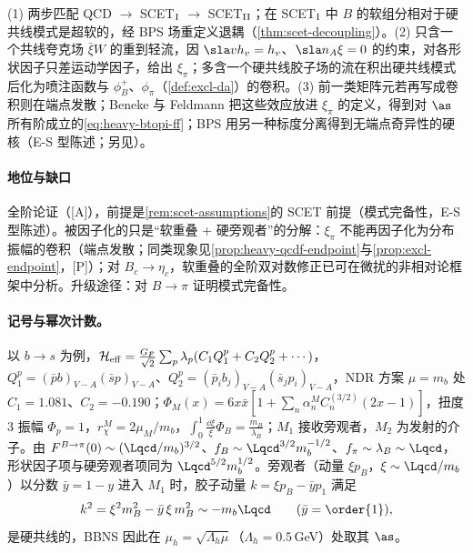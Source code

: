 \begin{proofsketch}
(1) 两步匹配 QCD $\to$ SCET$_{\rm I}$ $\to$ SCET$_{\rm II}$；在 SCET$_{\rm I}$ 中 $B$ 的软组分相对于硬共线模式是超软的，经 BPS 场重定义退耦（\cref{thm:scet-decoupling}）。(2) 只含一个共线夸克场 $\bar\xi W$ 的重到轻流，因 $\sla vh_v=h_v$、$\sla n_A\xi=0$ 的约束，对各形状因子只差运动学因子，给出 $\xi_\pi$；多含一个硬共线胶子场的流在积出硬共线模式后化为喷注函数与 $\phi_B^+$、$\phi_\pi$（\cref{def:excl-da}）的卷积。(3) 前一类矩阵元若再写成卷积则在端点发散；Beneke 与 Feldmann 把这些效应放进 $\xi_\pi$ 的定义，得到对 $\as$ 所有阶成立的\cref{eq:heavy-btopi-ff}\cite{Beneke:2003pa}；BPS 用另一种标度分离得到无端点奇异性的硬核\cite{Bauer:2002aj}（E-S 型陈述；另见\cite{Hill:2002vw,Beneke:2005gs}）。
\end{proofsketch}

\paragraph{地位与缺口}
全阶论证（[A]），前提是\cref{rem:scet-assumptions}的 SCET 前提（模式完备性，E-S 型陈述）。被因子化的只是“软重叠 + 硬旁观者”的分解：$\xi_\pi$ 不能再因子化为分布振幅的卷积（端点发散；同类现象见\cref{prop:heavy-qcdf-endpoint}与\cref{prop:excl-endpoint}，[P]）；对 $B_c\to\eta_c$，软重叠的全阶双对数修正已可在微扰的非相对论框架中分析\cite{Bell:2024bxg}。升级途径：对 $B\to\pi$ 证明模式完备性。

\paragraph{记号与幂次计数。}
以 $b\to s$ 为例，$\mathcal H_{\rm eff}=\frac{G_F}{\sqrt2}\sum_{p}\lambda_p(C_1Q_1^p+C_2Q_2^p+\cdots)$，$Q_1^p=(\bar pb)_{V-A}(\bar sp)_{V-A}$、$Q_2^p=(\bar p_ib_j)_{V-A}(\bar s_jp_i)_{V-A}$，NDR 方案 $\mu=m_b$ 处 $C_1=1.081$、$C_2=-0.190$\cite[表~1]{BenekeEtAl2001}；$\Phi_M(x)=6x\bar x[1+\sum_n\alpha_n^MC_n^{(3/2)}(2x-1)]$，扭度 3 振幅 $\Phi_p=1$，$r_\chi^M=2\mu_M/m_b$，$\int_0^1\frac{\dd\xi}{\xi}\Phi_B=\frac{m_B}{\lambda_B}$；$M_1$ 接收旁观者，$M_2$ 为发射的介子。由 $F^{B\to\pi}(0)\sim(\Lqcd/m_b)^{3/2}$、$f_B\sim\Lqcd^{3/2}m_b^{-1/2}$、$f_\pi\sim\lambda_B\sim\Lqcd$，形状因子项与硬旁观者项同为 $\Lqcd^{5/2}m_b^{1/2}$。旁观者（动量 $\xi p_B$，$\xi\sim\Lqcd/m_b$）以分数 $\bar y=1-y$ 进入 $M_1$ 时，胶子动量 $k=\xi p_B-\bar yp_1$ 满足
\begin{equation}\label{eq:heavy-hc-gluon}
k^2=\xi^2m_B^2-\bar y\,\xi\,m_B^2\sim-m_b\Lqcd\qquad(\bar y=\order{1}),
\end{equation}
是硬共线的，BBNS 因此在 $\mu_h=\sqrt{\Lambda_h\mu}$（$\Lambda_h=0.5$\,GeV）处取其 $\as$\cite{BenekeEtAl2001}。

